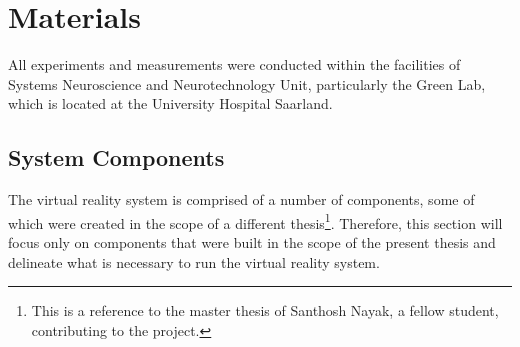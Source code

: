 
\section{Materials}
All experiments and measurements were conducted within the facilities of Systems Neuroscience and Neurotechnology Unit, particularly the Green Lab, which is located at the University Hospital Saarland. 

\subsection{System Components}
The virtual reality system is comprised of a number of components, some of which were created in the scope of a different thesis\footnote{This is a reference to the master thesis of Santhosh Nayak, a fellow student, contributing to the project.}. Therefore, this section will focus only on components that were built in the scope of the present thesis and delineate what is necessary to run the virtual reality system.
  
